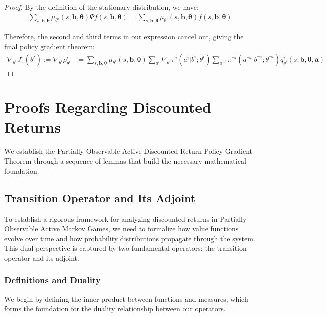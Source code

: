 \begin{proof}
    By the definition of the stationary distribution, we have:
    \begin{align}
        \sum_{s, \boldsymbol{b}, \boldsymbol{\theta}}\mu_{\theta^i}(s, \boldsymbol{b}, \boldsymbol{\theta}) \Psi f(s, \boldsymbol{b}, \boldsymbol{\theta}) = \sum_{s, \boldsymbol{b}, \boldsymbol{\theta}}\mu_{\theta^i}(s, \boldsymbol{b}, \boldsymbol{\theta}) f(s, \boldsymbol{b}, \boldsymbol{\theta})
    \end{align}

    Therefore, the second and third terms in our expression cancel out, giving the
    final policy gradient theorem:
    \begin{align}
        \nabla_{\theta^i}J^{i}_{\pi}(\theta^{i}) := \nabla_{\theta^i}\rho^{i}_{\theta^i} & = \sum_{s, \boldsymbol{b}, \boldsymbol{\theta}}\mu_{\theta^i}(s, \boldsymbol{b}, \boldsymbol{\theta}) \sum_{a^i}\nabla_{\theta^i}\pi^{i}(a^{i}|b^{i}; \theta^{i}) \sum_{a^{\neg i}}\pi^{\neg i}(a^{\neg i}|b^{\neg i}; \theta^{\neg i}) q^{i}_{\theta^i}(s, \boldsymbol{b}, \boldsymbol{\theta}, \boldsymbol{a})
    \end{align}
\end{proof}

\chapter{Proofs Regarding Discounted Returns}
\label{appendix:discounted_proofs} We establish the Partially Observable Active Discounted
Return Policy Gradient Theorem through a sequence of lemmas that build the necessary
mathematical foundation.
\section{Transition Operator and Its Adjoint}
To establish a rigorous framework for analyzing discounted returns in Partially
Observable Active Markov Games, we need to formalize how value functions evolve over
time and how probability distributions propagate through the system. This dual
perspective is captured by two fundamental operators: the transition operator and
its adjoint.

\subsection{Definitions and Duality}

We begin by defining the inner product between functions and measures, which forms
the foundation for the duality relationship between our operators.

